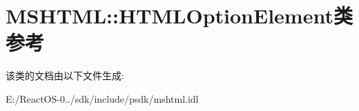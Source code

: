 \hypertarget{class_m_s_h_t_m_l_1_1_h_t_m_l_option_element}{}\section{M\+S\+H\+T\+ML\+:\+:H\+T\+M\+L\+Option\+Element类 参考}
\label{class_m_s_h_t_m_l_1_1_h_t_m_l_option_element}


该类的文档由以下文件生成\+:\begin{DoxyCompactItemize}
\item 
E\+:/\+React\+O\+S-\/0../sdk/include/psdk/mshtml.\+idl\end{DoxyCompactItemize}
